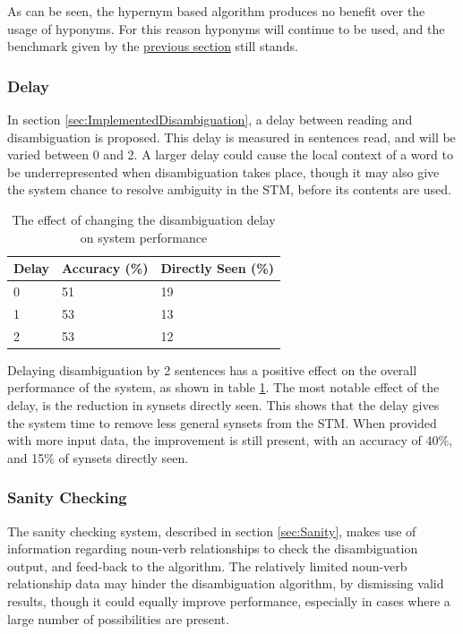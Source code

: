 \documentclass[]{article}
\begin{document}
As can be seen, the hypernym based algorithm produces no benefit over the usage of hyponyms. For this reason hyponyms will continue to be used, and the benchmark given by the \hyperref[sec:EvEpisodicBuffer]{previous section} still stands. 

\subsubsection{Delay}
\label{sec:EvDisDelay}
In section \ref{sec:ImplementedDisambiguation}, a delay between reading and disambiguation is proposed. This delay is measured in sentences read, and will be varied between 0 and 2. A larger delay could cause the local context of a word to be underrepresented when disambiguation takes place, though it may also give the system chance to resolve ambiguity in the STM, before its contents are used.

\begin{table}
\begin{center}
\begin{tabular}{|p{2em}|p{7em}|p{7em}|}
	\hline
	Delay & Accuracy (\%) & Directly Seen (\%) \\
	\hline
	0 & 51 & 19\\
	\hline
	1 & 53 & 13\\
	\hline
	2 & 53 & 12\\
	\hline
\end{tabular}
\end{center}
\caption{The effect of changing the disambiguation delay on system performance}
\label{table:Delay}
\end{table}

Delaying disambiguation by 2 sentences has a positive effect on the overall performance of the system, as shown in table \ref{table:Delay}. The most notable effect of the delay, is the reduction in synsets directly seen. This shows that the delay gives the system time to remove less general synsets from the STM. When provided with more input data, the improvement is still present, with an accuracy of 40\%, and 15\% of synsets directly seen.

\subsubsection{Sanity Checking} 
\label{sec:EvDisSanity}
The sanity checking system, described in section \ref{sec:Sanity}, makes use of information regarding noun-verb relationships to check the disambiguation output, and feed-back to the algorithm. The relatively limited noun-verb relationship data may hinder the disambiguation algorithm, by dismissing valid results, though it could equally improve performance, especially in cases where a large number of possibilities are present.
\end{document}
